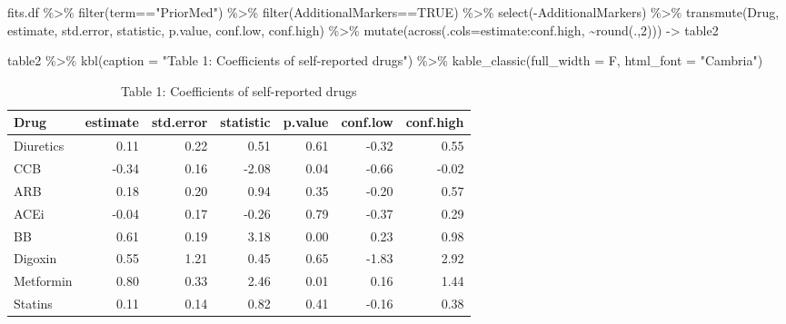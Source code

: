 \documentclass[
]{article}
\newenvironment{Shaded}{\begin{snugshade}}{\end{snugshade}}
\newcommand{\AttributeTok}[1]{\textcolor[rgb]{0.77,0.63,0.00}{#1}}
\newcommand{\ConstantTok}[1]{\textcolor[rgb]{0.00,0.00,0.00}{#1}}
\newcommand{\DecValTok}[1]{\textcolor[rgb]{0.00,0.00,0.81}{#1}}
\newcommand{\FunctionTok}[1]{\textcolor[rgb]{0.00,0.00,0.00}{#1}}
\newcommand{\NormalTok}[1]{#1}
\newcommand{\OtherTok}[1]{\textcolor[rgb]{0.56,0.35,0.01}{#1}}
\newcommand{\SpecialCharTok}[1]{\textcolor[rgb]{0.00,0.00,0.00}{#1}}
\newcommand{\StringTok}[1]{\textcolor[rgb]{0.31,0.60,0.02}{#1}}
\begin{document}
\begin{Shaded}
\begin{Highlighting}[]
\NormalTok{fits.df  }\SpecialCharTok{\%\textgreater{}\%} 
  \FunctionTok{filter}\NormalTok{(term}\SpecialCharTok{==}\StringTok{"PriorMed"}\NormalTok{) }\SpecialCharTok{\%\textgreater{}\%} 
  \FunctionTok{filter}\NormalTok{(AdditionalMarkers}\SpecialCharTok{==}\ConstantTok{TRUE}\NormalTok{) }\SpecialCharTok{\%\textgreater{}\%} 
  \FunctionTok{select}\NormalTok{(}\SpecialCharTok{{-}}\NormalTok{AdditionalMarkers) }\SpecialCharTok{\%\textgreater{}\%} 
  \FunctionTok{transmute}\NormalTok{(Drug, estimate, std.error, statistic, p.value, conf.low, conf.high) }\SpecialCharTok{\%\textgreater{}\%} 
  \FunctionTok{mutate}\NormalTok{(}\FunctionTok{across}\NormalTok{(}\AttributeTok{.cols=}\NormalTok{estimate}\SpecialCharTok{:}\NormalTok{conf.high, }\SpecialCharTok{\textasciitilde{}}\FunctionTok{round}\NormalTok{(.,}\DecValTok{2}\NormalTok{))) }\OtherTok{{-}\textgreater{}}\NormalTok{ table2}
\end{Highlighting}
\end{Shaded}

\begin{Shaded}
\begin{Highlighting}[]
\NormalTok{table2 }\SpecialCharTok{\%\textgreater{}\%} 
  \FunctionTok{kbl}\NormalTok{(}\AttributeTok{caption =} \StringTok{"Table 1: Coefficients of self{-}reported drugs"}\NormalTok{) }\SpecialCharTok{\%\textgreater{}\%}
  \FunctionTok{kable\_classic}\NormalTok{(}\AttributeTok{full\_width =}\NormalTok{ F, }\AttributeTok{html\_font =} \StringTok{"Cambria"}\NormalTok{)}
\end{Highlighting}
\end{Shaded}

\begin{table}

\caption{\label{tab:med-effect-table}Table 1: Coefficients of self-reported drugs}
\centering
\begin{tabular}[t]{l|r|r|r|r|r|r}
\hline
Drug & estimate & std.error & statistic & p.value & conf.low & conf.high\\
\hline
Diuretics & 0.11 & 0.22 & 0.51 & 0.61 & -0.32 & 0.55\\
\hline
CCB & -0.34 & 0.16 & -2.08 & 0.04 & -0.66 & -0.02\\
\hline
ARB & 0.18 & 0.20 & 0.94 & 0.35 & -0.20 & 0.57\\
\hline
ACEi & -0.04 & 0.17 & -0.26 & 0.79 & -0.37 & 0.29\\
\hline
BB & 0.61 & 0.19 & 3.18 & 0.00 & 0.23 & 0.98\\
\hline
Digoxin & 0.55 & 1.21 & 0.45 & 0.65 & -1.83 & 2.92\\
\hline
Metformin & 0.80 & 0.33 & 2.46 & 0.01 & 0.16 & 1.44\\
\hline
Statins & 0.11 & 0.14 & 0.82 & 0.41 & -0.16 & 0.38\\
\hline
\end{tabular}
\end{table}
\end{document}
